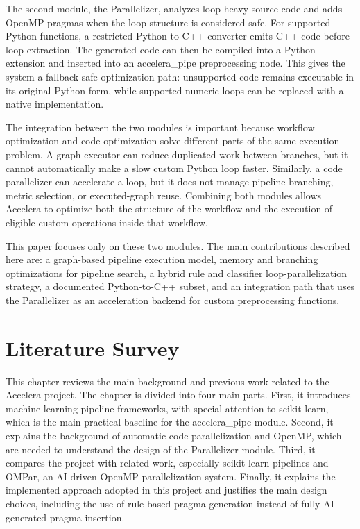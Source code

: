 \documentclass[12pt,a4paper,oneside]{report}
\newcommand{\systemname}{Accelera}
\begin{document}
The second module, the Parallelizer, analyzes loop-heavy source code and adds
OpenMP pragmas when the loop structure is considered safe. For supported Python
functions, a restricted Python-to-C++ converter emits C++ code before loop
extraction. The generated code can then be compiled into a Python extension and
inserted into an accelera\_pipe preprocessing node. This gives the
system a fallback-safe optimization path: unsupported code remains executable in
its original Python form, while supported numeric loops can be replaced with a
native implementation.

The integration between the two modules is important because workflow
optimization and code optimization solve different parts of the same execution
problem. A graph executor can reduce duplicated work between branches, but it
cannot automatically make a slow custom Python loop faster. Similarly, a code
parallelizer can accelerate a loop, but it does not manage pipeline branching,
metric selection, or executed-graph reuse. Combining both modules allows
Accelera to optimize both the structure of the workflow and the execution of
eligible custom operations inside that workflow.

This paper focuses only on these two modules. The main contributions described
here are: a graph-based pipeline execution model, memory and branching
optimizations for pipeline search, a hybrid rule and classifier
loop-parallelization strategy, a documented Python-to-C++ subset, and an
integration path that uses the Parallelizer as an acceleration backend for custom
preprocessing functions.

\chapter{Literature Survey}
\label{chap:literature-review}

This chapter reviews the main background and previous work related to the
\systemname{} project. The chapter is divided into four main parts. First, it
introduces machine learning pipeline frameworks, with special attention to
scikit-learn, which is the main practical baseline for the
accelera\_pipe module. Second, it explains the background of automatic
code parallelization and OpenMP, which are needed to understand the design of the
Parallelizer module. Third, it compares the project with related work, especially
scikit-learn pipelines and OMPar, an AI-driven OpenMP parallelization
system. Finally, it explains the implemented approach adopted in this project and
justifies the main design choices, including the use of rule-based pragma
generation instead of fully AI-generated pragma insertion.
\end{document}
